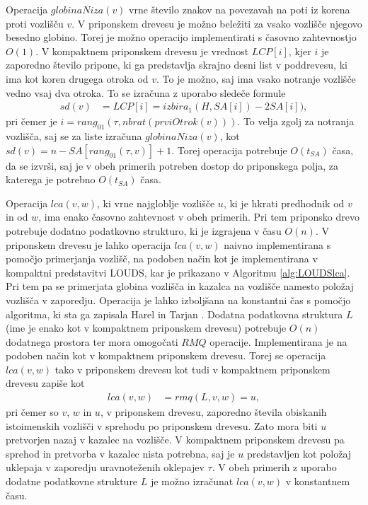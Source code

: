 Operacija $globinaNiza(v)$ vrne število znakov na povezavah na poti iz korena proti vozlišču $v$. V priponskem drevesu je možno beležiti za vsako vozlišče njegovo besedno globino. Torej je možno operacijo implementirati s časovno zahtevnostjo $O(1)$. V kompaktnem priponskem drevesu je vrednost $LCP[i]$, kjer $i$ je zaporedno število pripone, ki ga predstavlja skrajno desni list v poddrevesu, ki ima kot koren drugega otroka od $v$. To je možno, saj ima vsako notranje vozlišče vedno vsaj dva otroka. To se izračuna z uporabo sledeče formule
\begin{equation*}
\begin{split}
    sd(v)&=LCP[i]= izbira_1(H,SA[i])-2SA[i]),
\end{split}   
\end{equation*}
pri čemer je $i=rang_{01}(\tau,nbrat(prviOtrok(v)))$. To velja zgolj za notranja vozlišča, saj se za liste izračuna $globinaNiza(v)$, kot $sd(v)=n-SA[rang_{01}(\tau,v)]+1$. Torej operacija potrebuje $O(t_{SA})$ časa, da se izvrši, saj je v obeh primerih potreben dostop do priponskega polja, za katerega je potrebno $O(t_{SA})$ časa.


Operacija $lca(v,w)$, ki vrne najgloblje vozlišče $u$, ki je hkrati predhodnik od $v$ in od $w$, ima enako časovno zahtevnost v obeh primerih. Pri tem priponsko drevo potrebuje dodatno podatkovno strukturo, ki je izgrajena v času $O(n)$. V priponskem drevesu je lahko operacija $lca(v,w)$ naivno implementirana s pomočjo primerjanja vozlišč, na podoben način kot je implementirana v kompaktni predstavitvi LOUDS, kar je prikazano v Algoritmu \ref{alg:LOUDSlca}. Pri tem pa se primerjata globina vozlišča in kazalca na vozlišče namesto položaj vozlišča v zaporedju. Operacija je lahko izboljšana na konstantni čas s pomočjo algoritma, ki sta ga zapisala Harel in Tarjan \cite{Harel1984}. Dodatna podatkovna struktura $L$ (ime je enako kot v kompaktnem priponskem drevesu) potrebuje $O(n)$ dodatnega prostora ter mora omogočati $RMQ$ operacije. Implementirana je na podoben način kot  v kompaktnem priponskem drevesu. Torej se operacija $lca(v,w)$ tako v priponskem drevesu kot tudi v kompaktnem priponskem drevesu zapiše kot
\begin{equation*}
\begin{split}
    lca(v,w)&=rmq(L,v,w)=u,
\end{split}   
\end{equation*}
pri čemer so $v$, $w$ in $u$, v priponskem drevesu, zaporedno števila obiskanih istoimenskih vozlišči v sprehodu po priponskem drevesu. Zato mora biti $u$ pretvorjen nazaj v kazalec na vozlišče. V kompaktnem priponskem drevesu pa sprehod in pretvorba v kazalec nista potrebna, saj je $u$ predstavljen kot položaj uklepaja v zaporedju uravnoteženih oklepajev $\tau$. V obeh primerih z uporabo dodatne podatkovne strukture $L$ je možno izračunat $lca(v,w)$ v konstantnem času.

